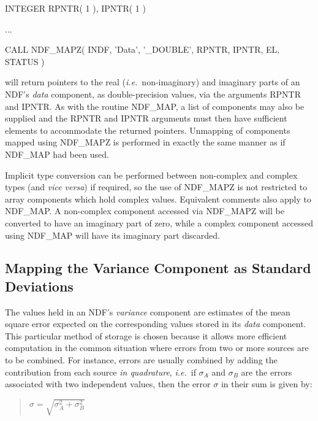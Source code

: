\documentclass[twoside,11pt,nolof]{starlink}
\providecommand{\st}[1]{{\emph{#1}}}
\begin{document}
\small
\begin{terminalv}
      INTEGER RPNTR( 1 ), IPNTR( 1 )

      ...

      CALL NDF_MAPZ( INDF, 'Data', '_DOUBLE', RPNTR, IPNTR, EL, STATUS )
\end{terminalv}
\normalsize

will return pointers to the real (\st{i.e.}\ non-imaginary\/) and imaginary parts
of an NDF's \st{data\/} component, as double-precision values, via the arguments
RPNTR and IPNTR.
As with the routine NDF\_MAP, a list of components may also be supplied and
the RPNTR and IPNTR arguments must then have sufficient elements to accommodate
the returned pointers.
Unmapping of components mapped using NDF\_MAPZ is performed in exactly  the same
manner as if NDF\_MAP had been used.

Implicit type conversion can be performed between non-complex and complex types
(and \st{vice versa\/}) if required, so the use of NDF\_MAPZ is not restricted to
array components which hold complex values.
Equivalent comments also apply to NDF\_MAP.
A non-complex component accessed via NDF\_MAPZ will be converted to have an
imaginary part of zero, while a complex component accessed using NDF\_MAP
will have its imaginary part discarded.

\subsection{\label{ss:stddev}Mapping the Variance Component as Standard Deviations}

The values held in an NDF's \st{variance\/} component are estimates of the
mean square error expected on the corresponding values stored in its
\st{data\/} component.
This particular method of storage is chosen because it allows more efficient
computation in the common situation where errors from two or more sources
are to be combined.
For instance, errors are usually combined by adding the contribution from
each source \st{in quadrature}, \st{i.e.}\ if $\sigma_{A}$ and
$\sigma_{B}$ are the errors associated with two independent values, then the
error $\sigma$ in their sum is given by:

\small
\begin{quote}
\begin{center}
$\sigma = \sqrt{ \sigma_{A}^{2} + \sigma_{B}^{2} }$
\end{center}
\end{quote}
\normalsize
\end{document}
